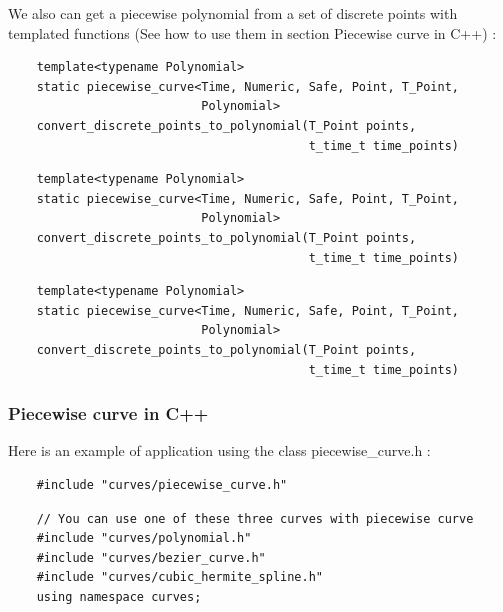 \documentclass{article}
\begin{document}
    We also can get a piecewise polynomial from a set of discrete points with templated functions (See how to use them in section Piecewise curve in C++) :
    \begin{lstlisting}
    template<typename Polynomial>
    static piecewise_curve<Time, Numeric, Safe, Point, T_Point, 
                           Polynomial>
    convert_discrete_points_to_polynomial(T_Point points, 
                                          t_time_t time_points)
    \end{lstlisting}
    \begin{lstlisting}
    template<typename Polynomial>
    static piecewise_curve<Time, Numeric, Safe, Point, T_Point, 
                           Polynomial>
    convert_discrete_points_to_polynomial(T_Point points, 
                                          t_time_t time_points)
    \end{lstlisting}
    \begin{lstlisting}
    template<typename Polynomial>
    static piecewise_curve<Time, Numeric, Safe, Point, T_Point, 
                           Polynomial>
    convert_discrete_points_to_polynomial(T_Point points, 
                                          t_time_t time_points)
    \end{lstlisting}
    
    \subsubsection{Piecewise curve in C++}
    Here is an example of application using the class piecewise\_curve.h :
    \begin{lstlisting}
    #include "curves/piecewise_curve.h"
    \end{lstlisting}
    \begin{lstlisting}
    // You can use one of these three curves with piecewise curve
    #include "curves/polynomial.h"
    #include "curves/bezier_curve.h"
    #include "curves/cubic_hermite_spline.h"
    using namespace curves;
    \end{lstlisting}
    
\end{document}
